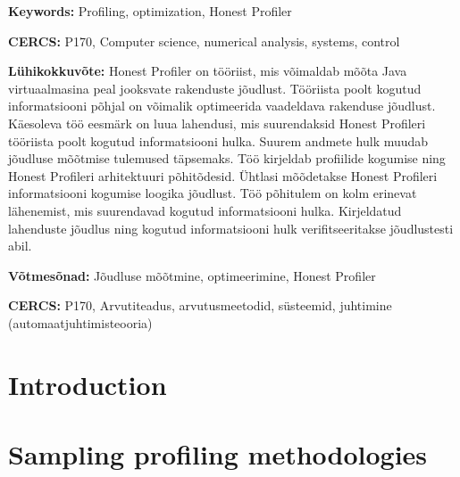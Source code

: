 \documentclass{style/thesis}
\begin{document}
\vspace*{3ex}
  \textbf{Keywords:} 
  Profiling, optimization, Honest Profiler
\vspace*{3ex}

\noindent\textbf{CERCS:} 
  P170, Computer science, numerical analysis, systems, control 

\vspace*{5ex}
\noindent\textbf{\large \articleNameEE}
\vspace*{0mm}

\noindent\textbf{Lühikokkuvõte:} Honest Profiler on tööriist, mis võimaldab mõõta Java virtuaalmasina peal jooksvate rakenduste jõudlust. Tööriista poolt kogutud informatsiooni põhjal on võimalik optimeerida vaadeldava rakenduse jõudlust. Käesoleva töö eesmärk on luua lahendusi, mis suurendaksid Honest Profileri tööriista poolt kogutud informatsiooni hulka.
Suurem andmete hulk muudab jõudluse mõõtmise tulemused täpsemaks. Töö kirjeldab profiilide kogumise ning Honest Profileri arhitektuuri põhitõdesid. Ühtlasi mõõdetakse Honest Profileri informatsiooni kogumise loogika jõudlust. Töö põhitulem on kolm erinevat lähenemist, mis suurendavad kogutud informatsiooni hulka. Kirjeldatud lahenduste jõudlus ning kogutud informatsiooni hulk verifitseeritakse jõudlustesti abil.
\vspace*{3ex}

\begin{flushleft}
  \textbf{Võtmesõnad:} 
  Jõudluse mõõtmine, optimeerimine, Honest Profiler
\end{flushleft}
\vspace*{3ex}

\noindent\textbf{CERCS:} 
  P170, Arvutiteadus, arvutusmeetodid, süsteemid, juhtimine (automaatjuhtimisteooria)
\newpage

\tableofcontents

\newpage
\section{Introduction}


\pagebreak

\section{Sampling profiling methodologies}
\label{sec:profiling}

\end{document}
